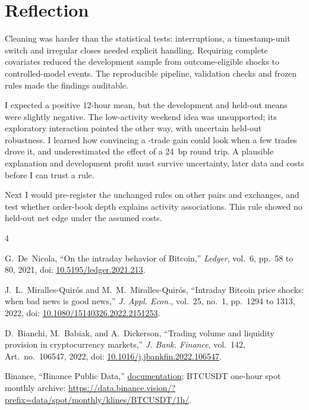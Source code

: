 \documentclass[11pt,a4paper]{article}
\begin{document}
\section{Reflection}

Cleaning was harder than the statistical tests: interruptions, a timestamp-unit switch and irregular closes needed explicit handling. Requiring complete covariates reduced the development sample from \DevSampleHOneN{} outcome-eligible shocks to \DevSampleHThreeN{} controlled-model events. The reproducible pipeline, validation checks and frozen rules made the findings auditable.

I expected a positive 12-hour mean, but the development and held-out means were slightly negative. The low-activity weekend idea was unsupported; its exploratory interaction pointed the other way, with uncertain held-out robustness. I learned how convincing a \DevWeekendTrades{}-trade gain could look when a few trades drove it, and underestimated the effect of a 24~bp round trip. A plausible explanation and development profit must survive uncertainty, later data and costs before I can trust a rule.

Next I would pre-register the unchanged rules on other pairs and exchanges, and test whether order-book depth explains activity associations. This rule showed no held-out net edge under the assumed costs.

\begingroup
\renewcommand{\section}[2]{\begin{center}\normalsize\scshape References\end{center}}
\footnotesize
\begin{thebibliography}{4}
\setlength{\itemsep}{2pt}

G.~De~Nicola, ``On the intraday behavior of Bitcoin,'' \emph{Ledger}, vol.~6, pp.~58 to 80, 2021, doi: \href{https://doi.org/10.5195/ledger.2021.213}{10.5195/ledger.2021.213}.

J.~L.~Miralles-Quir\'os and M.~M.~Miralles-Quir\'os, ``Intraday Bitcoin price shocks: when bad news is good news,'' \emph{J. Appl. Econ.}, vol.~25, no.~1, pp.~1294 to 1313, 2022, doi: \href{https://doi.org/10.1080/15140326.2022.2151253}{10.1080/15140326.2022.2151253}.

D.~Bianchi, M.~Babiak, and A.~Dickerson, ``Trading volume and liquidity provision in cryptocurrency markets,'' \emph{J. Bank. Finance}, vol.~142, Art.~no.~106547, 2022, doi: \href{https://doi.org/10.1016/j.jbankfin.2022.106547}{10.1016/j.jbankfin.2022.106547}.

Binance, ``Binance Public Data,'' \href{https://github.com/binance/binance-public-data}{documentation}; BTCUSDT one-hour spot monthly archive: \url{https://data.binance.vision/?prefix=data/spot/monthly/klines/BTCUSDT/1h/}.

\end{thebibliography}
\endgroup
\end{document}
